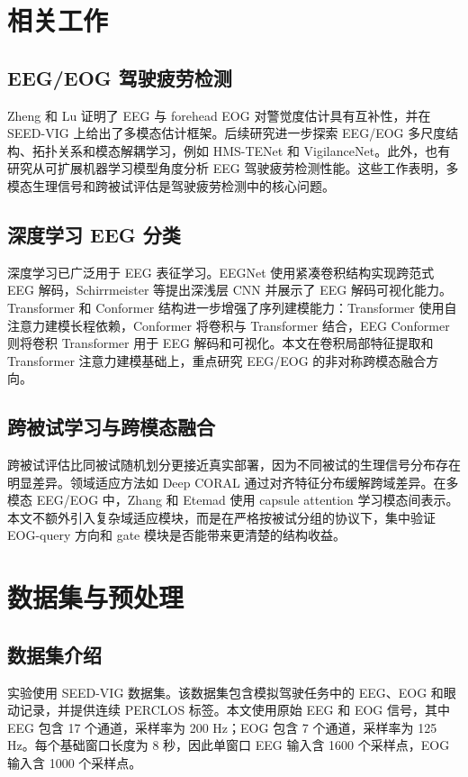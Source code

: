 \documentclass[UTF8,a4paper,10pt,fontset=windows]{ctexart}
\begin{document}
\section{相关工作}

\subsection{EEG/EOG 驾驶疲劳检测}
Zheng 和 Lu 证明了 EEG 与 forehead EOG 对警觉度估计具有互补性，并在 SEED-VIG 上给出了多模态估计框架\cite{zheng2017}。后续研究进一步探索 EEG/EOG 多尺度结构、拓扑关系和模态解耦学习，例如 HMS-TENet\cite{hmstenet2024} 和 VigilanceNet\cite{vigilancenet2022}。此外，也有研究从可扩展机器学习模型角度分析 EEG 驾驶疲劳检测性能\cite{hidalgo2024drowsiness}。这些工作表明，多模态生理信号和跨被试评估是驾驶疲劳检测中的核心问题。

\subsection{深度学习 EEG 分类}
深度学习已广泛用于 EEG 表征学习。EEGNet 使用紧凑卷积结构实现跨范式 EEG 解码\cite{eegnet2018}，Schirrmeister 等提出深浅层 CNN 并展示了 EEG 解码可视化能力\cite{schirrmeister2017deep}。Transformer 和 Conformer 结构进一步增强了序列建模能力：Transformer 使用自注意力建模长程依赖\cite{vaswani2017attention}，Conformer 将卷积与 Transformer 结合\cite{gulati2020conformer}，EEG Conformer 则将卷积 Transformer 用于 EEG 解码和可视化\cite{song2023eegconformer}。本文在卷积局部特征提取和 Transformer 注意力建模基础上，重点研究 EEG/EOG 的非对称跨模态融合方向。

\subsection{跨被试学习与跨模态融合}
跨被试评估比同被试随机划分更接近真实部署，因为不同被试的生理信号分布存在明显差异。领域适应方法如 Deep CORAL 通过对齐特征分布缓解跨域差异\cite{deepcoral2016}。在多模态 EEG/EOG 中，Zhang 和 Etemad 使用 capsule attention 学习模态间表示\cite{zhang2021capsule}。本文不额外引入复杂域适应模块，而是在严格按被试分组的协议下，集中验证 EOG-query 方向和 gate 模块是否能带来更清楚的结构收益。

\section{数据集与预处理}

\subsection{数据集介绍}
实验使用 SEED-VIG 数据集\cite{seedvig}。该数据集包含模拟驾驶任务中的 EEG、EOG 和眼动记录，并提供连续 PERCLOS 标签。本文使用原始 EEG 和 EOG 信号，其中 EEG 包含 17 个通道，采样率为 200 Hz；EOG 包含 7 个通道，采样率为 125 Hz。每个基础窗口长度为 8 秒，因此单窗口 EEG 输入含 1600 个采样点，EOG 输入含 1000 个采样点。
\end{document}
